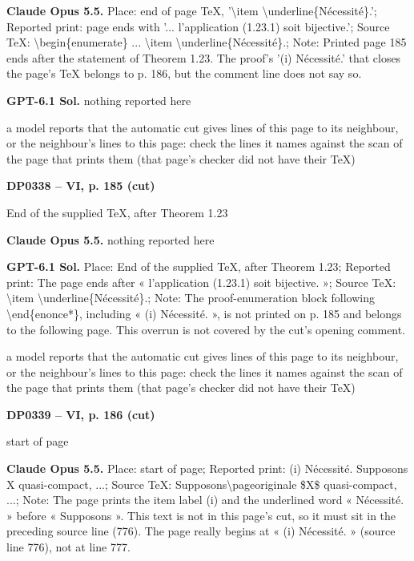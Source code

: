\textbf{Claude Opus 5.5.} Place: end of page TeX, '\textbackslash{}item \textbackslash{}underline\{Nécessité\}.'; Reported print: page ends with '... l'application (1.23.1) soit bijective.'; Source TeX: \textbackslash{}begin\{enumerate\} ... \textbackslash{}item \textbackslash{}underline\{Nécessité\}.; Note: Printed page 185 ends after the statement of Theorem 1.23. The proof's '(i) Nécessité.' that closes the page's TeX belongs to p. 186, but the comment line does not say so.\par
\textbf{GPT-6.1 Sol.} nothing reported here\par
a model reports that the automatic cut gives lines of this page to its neighbour, or the neighbour's lines to this page: check the lines it names against the scan of the page that prints them (that page's checker did not have their TeX)\par
\par\noindent\hypertarget{DP0338}{}\textbf{DP0338 -- VI, p. 185 (cut)}\par
End of the supplied TeX, after Theorem 1.23\par
\textbf{Claude Opus 5.5.} nothing reported here\par
\textbf{GPT-6.1 Sol.} Place: End of the supplied TeX, after Theorem 1.23; Reported print: The page ends after « l'application (1.23.1) soit bijective. »; Source TeX: \textbackslash{}item \textbackslash{}underline\{Nécessité\}.; Note: The proof-enumeration block following \textbackslash{}end\{enonce*\}, including « (i) Nécessité. », is not printed on p. 185 and belongs to the following page. This overrun is not covered by the cut's opening comment.\par
a model reports that the automatic cut gives lines of this page to its neighbour, or the neighbour's lines to this page: check the lines it names against the scan of the page that prints them (that page's checker did not have their TeX)\par
\par\noindent\hypertarget{DP0339}{}\textbf{DP0339 -- VI, p. 186 (cut)}\par
start of page\par
\textbf{Claude Opus 5.5.} Place: start of page; Reported print: (i)  Nécessité. Supposons X quasi-compact, ...; Source TeX: Supposons\textbackslash{}pageoriginale \$X\$ quasi-compact, ...; Note: The page prints the item label (i) and the underlined word « Nécessité. » before « Supposons ». This text is not in this page's cut, so it must sit in the preceding source line (776). The page really begins at « (i) Nécessité. » (source line 776), not at line 777.\par
